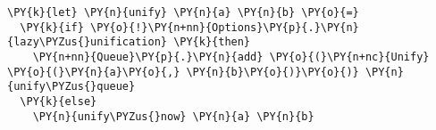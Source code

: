 \begin{Verbatim}[commandchars=\\\{\}]
\PY{k}{let} \PY{n}{unify} \PY{n}{a} \PY{n}{b} \PY{o}{=}
  \PY{k}{if} \PY{o}{!}\PY{n+nn}{Options}\PY{p}{.}\PY{n}{lazy\PYZus{}unification} \PY{k}{then}
    \PY{n+nn}{Queue}\PY{p}{.}\PY{n}{add} \PY{o}{(}\PY{n+nc}{Unify} \PY{o}{(}\PY{n}{a}\PY{o}{,} \PY{n}{b}\PY{o}{)}\PY{o}{)} \PY{n}{unify\PYZus{}queue}
  \PY{k}{else}
    \PY{n}{unify\PYZus{}now} \PY{n}{a} \PY{n}{b}
\end{Verbatim}
